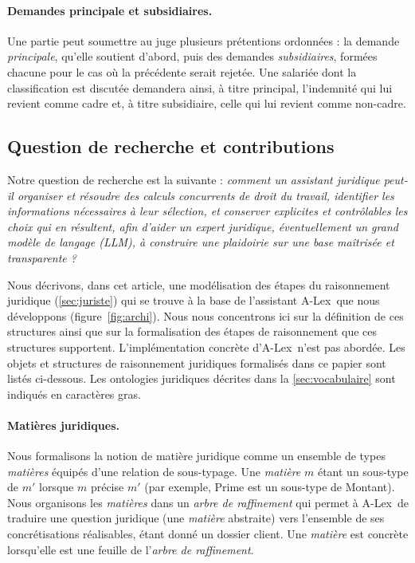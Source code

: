 \documentclass[review]{jflart}
\newcommand{\ALex}{A-Lex}
\begin{document}
\paragraph{Demandes principale et subsidiaires.} Une partie peut soumettre au
  juge plusieurs prétentions ordonnées : la demande \emph{principale}, qu'elle
  soutient d'abord, puis des demandes \emph{subsidiaires}, formées chacune pour
  le cas où la précédente serait rejetée. Une salariée dont la classification
  est discutée demandera ainsi, à titre principal, l'indemnité qui lui revient
  comme cadre et, à titre subsidiaire, celle qui lui revient comme non-cadre.
\subsection{Question de recherche et contributions}\label{sec:question}
Notre question de recherche est la suivante : \emph{comment un assistant
juridique peut-il organiser et résoudre des calculs concurrents de droit du
travail, identifier les informations nécessaires à leur sélection, et conserver
explicites et contrôlables les choix qui en résultent, afin d'aider un expert
juridique, éventuellement un grand modèle de langage (LLM), à construire une
plaidoirie sur une base maîtrisée et transparente ?} 

Nous décrivons, dans cet article, une modélisation des étapes du raisonnement juridique (\autoref{sec:juriste}) qui se trouve à la base de l'assistant \ALex~que nous développons
(figure~\ref{fig:archi}). Nous nous concentrons ici sur la définition de ces structures ainsi que sur la formalisation des étapes de raisonnement que ces structures supportent. L'implémentation concrète d'\ALex~n'est pas abordée. Les objets et structures de raisonnement juridiques formalisés dans ce papier sont listés ci-dessous. Les ontologies juridiques décrites dans la \autoref{sec:vocabulaire} sont indiqués en caractères gras.
\paragraph{Matières juridiques.}
Nous formalisons la notion de matière juridique comme un ensemble de types \emph{matières} équipés d'une relation de sous-typage. Une \emph{matière} $m$ étant un sous-type de $m'$ lorsque $m$ précise $m'$ (par exemple, \textsf{Prime} est un sous-type de \textsf{Montant}). Nous organisons les \emph{matières} dans un \emph{arbre de raffinement} qui permet à \ALex~de traduire une question juridique (une \emph{matière} abstraite) vers l'ensemble de ses concrétisations réalisables, étant donné un dossier client. Une \emph{matière} est concrète lorsqu'elle est une feuille de l'\emph{arbre de raffinement}.
\end{document}
